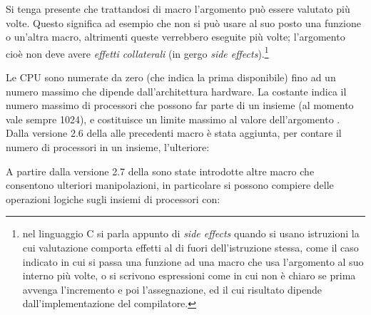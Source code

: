 Si tenga presente che trattandosi di macro l'argomento  può essere
valutato più volte. Questo significa ad esempio che non si può usare al suo
posto una funzione o un'altra macro, altrimenti queste verrebbero eseguite più
volte; l'argomento cioè non deve avere \textsl{effetti collaterali} (in gergo
 \textit{side effects}).\footnote{nel linguaggio C si
  parla appunto di \textit{side effects} quando si usano istruzioni la cui
  valutazione comporta effetti al di fuori dell'istruzione stessa, come il
  caso indicato in cui si passa una funzione ad una macro che usa l'argomento
  al suo interno più volte, o si scrivono espressioni come  in cui
  non è chiaro se prima avvenga l'incremento e poi l'assegnazione, ed il cui
  risultato dipende dall'implementazione del compilatore.}


Le CPU sono numerate da zero (che indica la prima disponibile) fino ad un
numero massimo che dipende dall'architettura hardware. La costante
 indica il numero massimo di processori che possono far
parte di un insieme (al momento vale sempre 1024), e costituisce un limite
massimo al valore dell'argomento .  Dalla versione 2.6 della
 alle precedenti macro è stata aggiunta, per contare il numero di
processori in un insieme, l'ulteriore:

{\centering
\vspace{3pt}
\begin{funcbox}{ 
}
\end{funcbox}}

A partire dalla versione 2.7 della  sono state introdotte altre
macro che consentono ulteriori manipolazioni, in particolare si possono
compiere delle operazioni logiche sugli insiemi di processori con:

{\centering
\vspace{3pt}
\begin{funcbox}{ 
}
\end{funcbox}}

